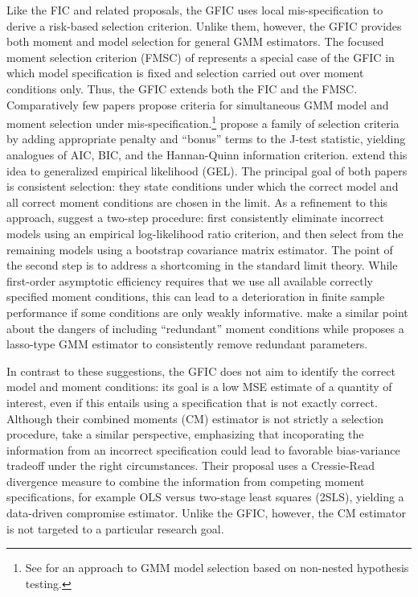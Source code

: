 Like the FIC and related proposals, the GFIC uses local mis-specification to derive a risk-based selection criterion.
Unlike them, however, the GFIC provides both moment and model selection for general GMM estimators. 
The focused moment selection criterion (FMSC) of \cite{DiTraglia2012} represents a special case of the GFIC in which model specification is fixed and selection carried out over moment conditions only. 
Thus, the GFIC extends both the FIC and the FMSC.
Comparatively few papers propose criteria for simultaneous GMM model and moment selection under mis-specification.\footnote{See \cite{Smith1992} for an approach to GMM model selection based on non-nested hypothesis testing.} \cite{AndrewsLu} propose a family of selection criteria by adding appropriate penalty and ``bonus'' terms to the J-test statistic, yielding analogues of AIC, BIC, and the Hannan-Quinn information criterion.
\cite{HongPrestonShum} extend this idea to generalized empirical likelihood (GEL). 
The principal goal of both papers is consistent selection: they state conditions under which the correct model and all correct moment conditions are chosen in the limit. 
As a refinement to this approach, \cite{LaiSmallLiu} suggest a two-step procedure: first consistently eliminate incorrect models using an empirical log-likelihood ratio criterion, and then select from the remaining models using a bootstrap covariance matrix estimator. 
The point of the second step is to address a shortcoming in the standard limit theory. 
While first-order asymptotic efficiency requires that we use all available correctly specified moment conditions, this can lead to a deterioration in finite sample performance if some conditions are only weakly informative.
\cite{HallPeixe2003} make a similar point about the dangers of including ``redundant'' moment conditions while \cite{Caner2009} proposes a lasso-type GMM estimator to consistently remove redundant parameters.


In contrast to these suggestions, the GFIC does not aim to identify the correct model and moment conditions: its goal is a low MSE estimate of a quantity of interest, even if this entails using a specification that is not exactly correct.  
Although their combined moments (CM) estimator is not strictly a selection procedure, \cite{JudgeMittelhammer} take a similar perspective, emphasizing that incoporating the information from an incorrect specification could lead to favorable bias-variance tradeoff under the right circumstances. 
Their proposal uses a Cressie-Read divergence measure to combine the information from competing moment specifications, for example OLS versus two-stage least squares (2SLS), yielding a data-driven compromise estimator. 
Unlike the GFIC, however, the CM estimator is not targeted to a particular research goal.

